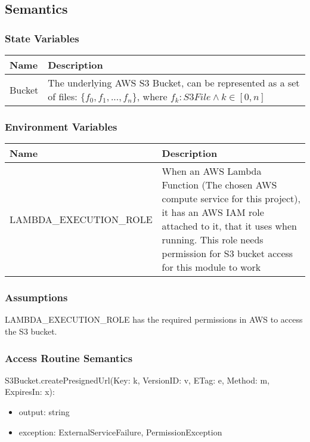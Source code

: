 \documentclass[12pt, titlepage]{article}
\begin{document}
\subsection{Semantics}

\subsubsection{State Variables}

\begin{center}
  \begin{tabular}{p{4cm} p{12cm}}
    \hline
    \textbf{Name} & \textbf{Description} \\
    \hline
    Bucket & The underlying AWS S3 Bucket, can be represented
    as a set of files: $\{f_0, f_1, ..., f_n\}$, where $f_k: S3File
    \land k\in[0,n]$ \\
    \hline
  \end{tabular}
\end{center}

\subsubsection{Environment Variables}

\begin{center}
  \begin{tabular}{p{6cm} p{10cm}}
    \hline
    \textbf{Name} & \textbf{Description} \\
    \hline
    LAMBDA\_EXECUTION\_ROLE & When an AWS Lambda Function (The chosen
    AWS compute service for this project), it has an AWS IAM role
    attached to it, that it uses when running. This role needs
    permission for S3 bucket access for this module to work \\
    \hline
  \end{tabular}
\end{center}

\subsubsection{Assumptions}

LAMBDA\_EXECUTION\_ROLE has the required permissions in AWS to access
the S3 bucket.

\subsubsection{Access Routine Semantics}

\noindent S3Bucket.createPresignedUrl(Key: k, VersionID: v, ETag: e,
Method: m, ExpiresIn: x):
\begin{itemize}
  \item output: string
  \item exception: ExternalServiceFailure, PermissionException
\end{itemize}
\end{document}
